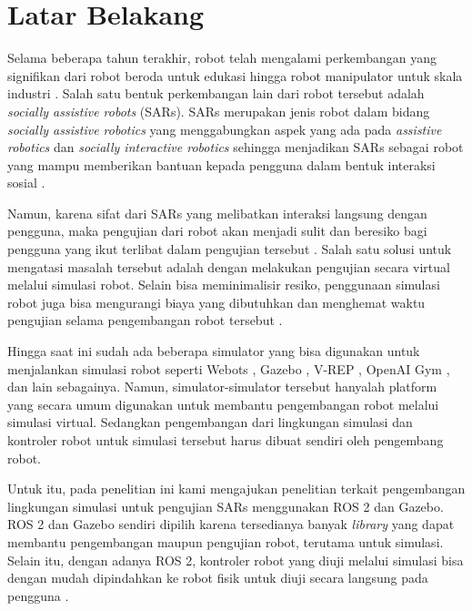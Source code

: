 \section{Latar Belakang}
\label{sec:latarbelakang}

Selama beberapa tahun terakhir, robot telah mengalami perkembangan yang signifikan dari robot beroda untuk edukasi \citep{cit:goncalves2009} hingga robot manipulator untuk skala industri \citep{cit:blatnicky2020}.
Salah satu bentuk perkembangan lain dari robot tersebut adalah \emph{socially assistive robots} (SARs).
SARs merupakan jenis robot dalam bidang \emph{socially assistive robotics} yang menggabungkan aspek yang ada pada \emph{assistive robotics} dan \emph{socially interactive robotics} sehingga menjadikan SARs sebagai robot yang mampu memberikan bantuan kepada pengguna dalam bentuk interaksi sosial \citep{cit:seifer2005}.

Namun, karena sifat dari SARs yang melibatkan interaksi langsung dengan pengguna, maka pengujian dari robot akan menjadi sulit dan beresiko bagi pengguna yang ikut terlibat dalam pengujian tersebut \citep{cit:erickson2020}.
Salah satu solusi untuk mengatasi masalah tersebut adalah dengan melakukan pengujian secara virtual melalui simulasi robot.
Selain bisa meminimalisir resiko, penggunaan simulasi robot juga bisa mengurangi biaya yang dibutuhkan dan menghemat waktu pengujian selama pengembangan robot tersebut \citep{cit:takaya2016}.

Hingga saat ini sudah ada beberapa simulator yang bisa digunakan untuk menjalankan simulasi robot seperti Webots \citep{cit:michel2004}, Gazebo \citep{cit:koenig2004}, V-REP \citep{cit:rohmer2013}, OpenAI Gym \citep{cit:brockman2016}, dan lain sebagainya.
Namun, simulator-simulator tersebut hanyalah platform yang secara umum digunakan untuk membantu pengembangan robot melalui simulasi virtual.
Sedangkan pengembangan dari lingkungan simulasi dan kontroler robot untuk simulasi tersebut harus dibuat sendiri oleh pengembang robot.

Untuk itu, pada penelitian ini kami mengajukan penelitian terkait pengembangan lingkungan simulasi untuk pengujian SARs menggunakan ROS 2 dan Gazebo.
ROS 2 dan Gazebo sendiri dipilih karena tersedianya banyak \emph{library} yang dapat membantu pengembangan maupun pengujian robot, terutama untuk simulasi.
Selain itu, dengan adanya ROS 2, kontroler robot yang diuji melalui simulasi bisa dengan mudah dipindahkan ke robot fisik untuk diuji secara langsung pada pengguna \citep{cit:takaya2016}.
